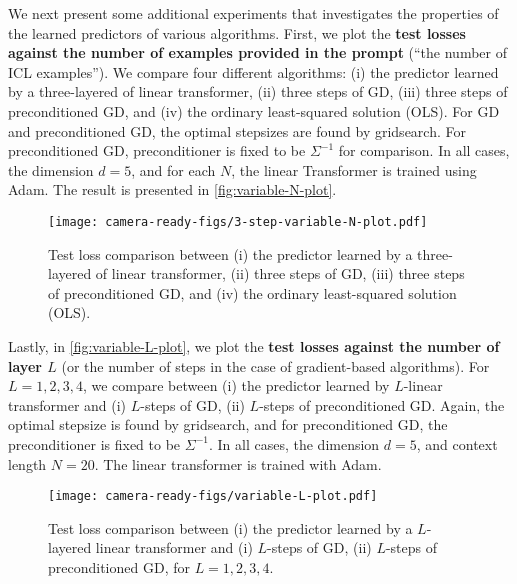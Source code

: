 \documentclass{article}
\begin{document}
We next present some additional experiments that investigates the properties of the learned predictors of various algorithms.  First, we plot  the \textbf{test losses against the number of examples provided in the prompt} (``the number of ICL examples''). We compare four different algorithms: (i) the predictor learned by a three-layered of linear transformer, (ii) three steps of GD, (iii)  three steps of preconditioned GD, and (iv) the ordinary least-squared solution (OLS). For GD and preconditioned GD, the optimal stepsizes are found by gridsearch. For preconditioned GD, preconditioner is fixed to be $\Sigma^{-1}$ for comparison. In all cases, the dimension $d=5$, and for each $N$, the linear Transformer is trained using Adam. The result is presented in \autoref{fig:variable-N-plot}.
\begin{figure}[H]
\centering 
\texttt{[image: camera-ready-figs/3-step-variable-N-plot.pdf]}
\caption{Test loss comparison between (i) the predictor learned by a three-layered of linear transformer, (ii) three steps of GD, (iii)  three steps of preconditioned GD, and (iv) the ordinary least-squared solution (OLS).} 
\label{fig:variable-N-plot} 
\end{figure}
Lastly, in \autoref{fig:variable-L-plot},  we plot the \textbf{test losses against the number of layer $L$} (or the number of steps in the case of gradient-based algorithms).
For $L=1,2,3,4$, we compare between (i) the predictor learned by $L$-linear transformer and (i) $L$-steps of GD, (ii) $L$-steps of preconditioned GD. Again, the optimal stepsize is found by gridsearch, and for preconditioned GD, the preconditioner is fixed to be $\Sigma^{-1}$. In all cases, the dimension $d=5$, and context length $N=20$. The linear transformer is trained with Adam.
\begin{figure}[H]
\centering 
\texttt{[image: camera-ready-figs/variable-L-plot.pdf]}
\caption{Test loss comparison between (i) the predictor learned by a $L$-layered linear transformer and (i) $L$-steps of GD, (ii) $L$-steps of preconditioned GD, for $L=1,2,3,4$. } 
\label{fig:variable-L-plot} 
\end{figure}

\newpage 
\end{document}
